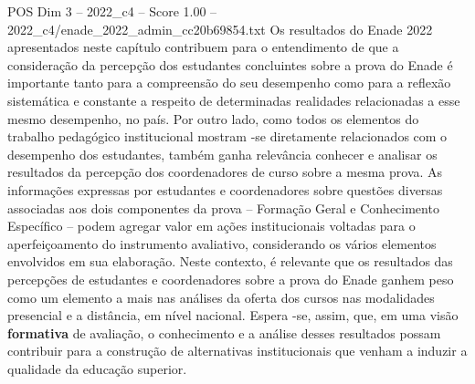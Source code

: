 \begin{textsample}{POS Dim 3 – 2022\_c4 – Score 1.00 – 2022\_c4/enade\_2022\_admin\_cc20b69854.txt}
Os resultados do Enade 2022 apresentados neste capítulo contribuem para o entendimento de que a consideração da percepção dos estudantes concluintes sobre a prova do Enade é importante tanto para a compreensão do seu desempenho como para a reflexão sistemática e constante a respeito de determinadas realidades relacionadas a esse mesmo desempenho, no país.
Por outro lado, como todos os elementos do trabalho pedagógico institucional mostram -se diretamente relacionados com o desempenho dos estudantes, também ganha relevância conhecer e analisar os resultados da percepção dos coordenadores de curso sobre a mesma prova.
As informações expressas por estudantes e coordenadores sobre questões diversas associadas aos dois componentes da prova – Formação Geral e Conhecimento Específico – podem agregar valor em ações institucionais voltadas para o aperfeiçoamento do instrumento avaliativo, considerando os vários elementos envolvidos em sua elaboração.
Neste contexto, é relevante que os resultados das percepções de estudantes e coordenadores sobre a prova do Enade ganhem peso como um elemento a mais nas análises da oferta dos cursos nas modalidades presencial e a distância, em nível nacional.
Espera -se, assim, que, em uma visão \textbf{formativa} de avaliação, o conhecimento e a análise desses resultados possam contribuir para a construção de alternativas institucionais que venham a induzir a qualidade da educação superior.

\end{textsample}
